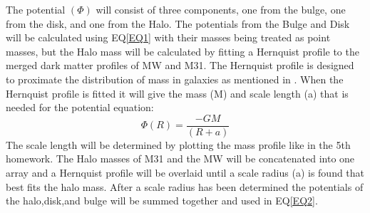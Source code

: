 \documentclass[fleqn,usenatbib]{mnras}
\begin{document}
The potential $(\Phi)$ will consist of three components, one from the bulge, one from the disk, and one from the Halo. The potentials from the Bulge and Disk will be calculated using EQ\ref{EQ1} with their masses being treated as point masses, but the Halo mass will be calculated by fitting a Hernquist profile to the merged dark matter profiles of MW and M31. The Hernquist profile is designed to proximate the distribution of mass in galaxies as mentioned in \cite{Hernquist1990ApJ}.  When the Hernquist profile is fitted it will give the mass (M) and scale length (a) that is needed for the potential equation:
\begin{equation}
    \Phi(R) = \frac{-GM}{(R+a)}
    \label{EQ3}
\end{equation}
The scale length will be determined by plotting the mass profile like in the 5th homework. The Halo masses of M31 and the MW will be concatenated into one array and a Hernquist profile will be overlaid until a scale radius (a) is found that best fits the halo mass. After a scale radius has been determined the potentials of the halo,disk,and bulge will be summed together and used in EQ\ref{EQ2}.
\end{document}
